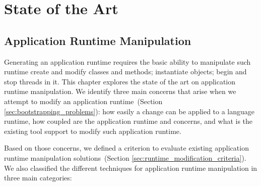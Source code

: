 
\part{State of the Art}



\chapter{Application Runtime Manipulation}
\minitoc

Generating an application runtime requires the basic ability to manipulate such runtime \eg create and modify classes and methods; instantiate objects; begin and stop threads in it. This chapter explores the state of the art on application runtime manipulation. We identify three main concerns that arise when we attempt to modify an application runtime~(Section \ref{sec:bootstrapping_problems}): how easily a change can be applied to a language runtime, how coupled are the application runtime and \VM concerns, and what is the existing tool support to modify such application runtime.

Based on those concerns, we defined a criterion to evaluate existing application runtime manipulation solutions~(Section \ref{sec:runtime_modification_criteria}). We also classified the different techniques for application runtime manipulation in three main categories:

